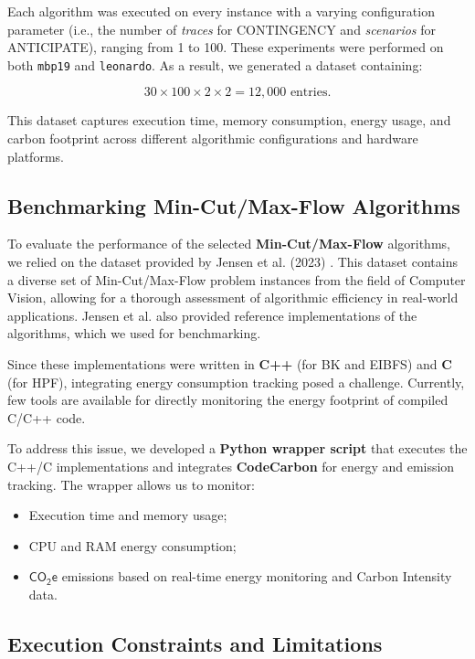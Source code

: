 \documentclass[a4paper,singleside,12pt]{report} %
\begin{document}
Each algorithm was executed on every instance with a varying configuration parameter (i.e., the number of \textit{traces} for CONTINGENCY and \textit{scenarios} for ANTICIPATE), ranging 
from 1 to 100. These experiments were performed on both \verb|mbp19| and \verb|leonardo|. As a result, we generated a dataset containing:

\begin{equation}
    30 \times 100 \times 2 \times 2 = 12,000 \text{ entries}.
\end{equation}

This dataset captures execution time, memory consumption, energy usage, and carbon footprint across different algorithmic configurations and hardware platforms.

\subsection{Benchmarking Min-Cut/Max-Flow Algorithms}

To evaluate the performance of the selected \textbf{Min-Cut/Max-Flow} algorithms, we relied on the dataset provided by Jensen et al. (2023) \cite{Jensen2023Maxflow}. This dataset contains a 
diverse set of Min-Cut/Max-Flow problem instances from the field of Computer Vision, allowing for a thorough assessment of algorithmic efficiency in real-world applications. Jensen et al. also
provided reference implementations of the algorithms, which we used for benchmarking.

Since these implementations were written in \textbf{C++} (for BK and EIBFS) and \textbf{C} (for HPF), integrating energy consumption tracking posed a challenge. Currently, few tools are 
available for directly monitoring the energy footprint of compiled C/C++ code. %

To address this issue, we developed a \textbf{Python wrapper script} that executes the C++/C implementations and integrates \textbf{CodeCarbon} for energy and emission tracking. The wrapper 
allows us to monitor:
\begin{itemize}
    \item Execution time and memory usage;
    \item CPU and RAM energy consumption;
    \item $\mathsf{CO_2e}$ emissions based on real-time energy monitoring and Carbon Intensity data.
\end{itemize}

\subsection{Execution Constraints and Limitations}
\end{document}
